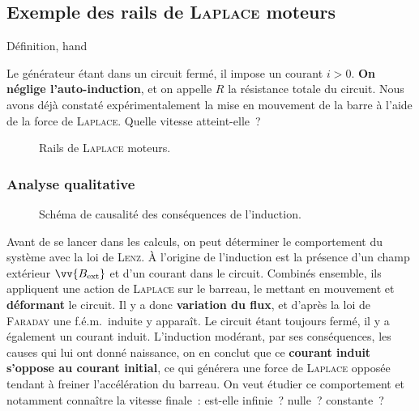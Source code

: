 \documentclass[../main/main.tex]{subfiles}
\begin{document}
\subsection{Exemple des rails de \textsc{Laplace} moteurs}
\label{ssec:rlplmot}
\begin{tdefi}{Définition, hand}
\end{tdefi}
Le générateur étant dans un circuit fermé, il impose un courant $i > 0$.
\textbf{On néglige l'auto-induction}, et on appelle $R$ la résistance totale du
circuit. Nous avons déjà constaté expérimentalement la mise en mouvement de la
barre à l'aide de la force de \textsc{Laplace}. Quelle vitesse atteint-elle~?
\begin{figure}[h]
	\centering
	\caption{Rails de \textsc{Laplace} moteurs.}
	\label{fig:rlplmot_schema}
\end{figure}
\vspace*{-20pt}

\subsubsection{Analyse qualitative}
\label{ssec:rlplmot_anaqual}
\begin{figure}[H]
	\centering
	\caption{Schéma de causalité des conséquences de l'induction.}
	\label{fig:modlenz_rlplmot}
\end{figure}
Avant de se lancer dans les calculs, on peut déterminer le comportement du
système avec la loi de \textsc{Lenz}. À l'origine de l'induction est la présence
d'un champ extérieur $\vv{B_{\rm ext}}$ et d'un courant dans le circuit.
Combinés ensemble, ils appliquent une action de \textsc{Laplace} sur le barreau,
le mettant en mouvement et \textbf{déformant} le circuit. Il y a donc
\textbf{variation du flux}, et d'après la loi de \textsc{Faraday} une f.é.m.\
induite y apparaît. Le circuit étant toujours fermé, il y a également un courant
induit.
\smallbreak
L'induction modérant, par ses conséquences, les causes qui lui ont donné
naissance, on en conclut que ce \textbf{courant induit s'oppose au courant
	initial}, ce qui générera une force de \textsc{Laplace} opposée tendant à
freiner l'accélération du barreau. On veut étudier ce comportement et notamment
connaître la vitesse finale~: est-elle infinie~? nulle~? constante~?
\end{document}
